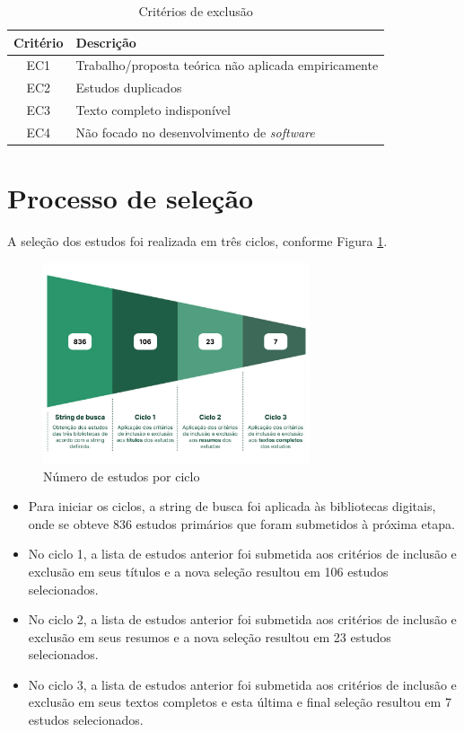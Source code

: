 \documentclass[
	12pt,
	openright,
	twoside,
	a4paper,
	english,
	brazil
	]{abntex2}
\begin{document}
\begin{table}[H]
  \centering
  \caption{Critérios de exclusão}
  \begin{tabular}{|c|l|}
  \hline
  \textbf{Critério} & \textbf{Descrição} \\ \hline
  EC1 & Trabalho/proposta teórica não aplicada empiricamente \\ \hline
  EC2 & Estudos duplicados \\ \hline
  EC3 & Texto completo indisponível \\ \hline
  EC4 & Não focado no desenvolvimento de \textit{software} \\ \hline
  \end{tabular}
\end{table}


\section{Processo de seleção}

A seleção dos estudos foi realizada em três ciclos, conforme Figura \ref{numero-estudos-ciclo}.

\begin{figure}[H]
	\centering
  \caption{\label{numero-estudos-ciclo}Número de estudos por ciclo}
  \includegraphics[width=0.7\textwidth]{numero-estudos-ciclo}
\end{figure}

\begin{itemize}
  \item Para iniciar os ciclos, a string de busca foi aplicada às bibliotecas digitais, onde se obteve 836 estudos primários que foram submetidos à próxima etapa.
  \item No ciclo 1, a lista de estudos anterior foi submetida aos critérios de inclusão e exclusão em seus títulos e a nova seleção resultou em 106 estudos selecionados.
  \item No ciclo 2, a lista de estudos anterior foi submetida aos critérios de inclusão e exclusão em seus resumos e a nova seleção resultou em 23 estudos selecionados.
  \item No ciclo 3, a lista de estudos anterior foi submetida aos critérios de inclusão e exclusão em seus textos completos e esta última e final seleção resultou em 7 estudos selecionados.
\end{itemize}
\end{document}
